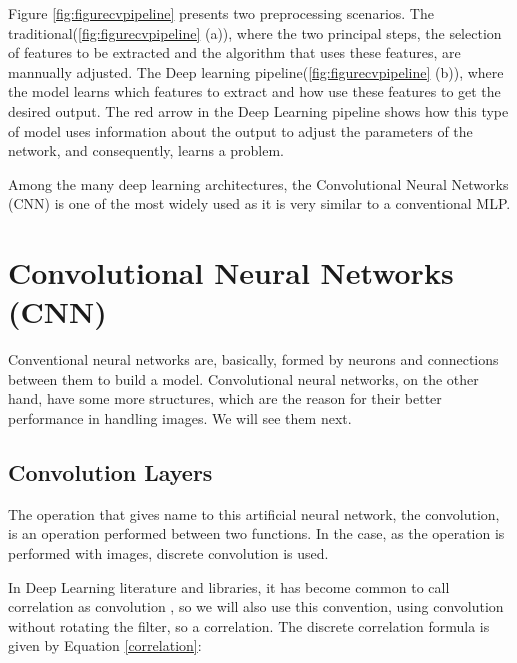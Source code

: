 Figure \ref{fig:figurecvpipeline} presents two preprocessing scenarios. The traditional(\ref{fig:figurecvpipeline} (a)), where the two principal steps, the selection of features to be extracted and the algorithm that uses these features, are mannually adjusted. The Deep learning pipeline(\ref{fig:figurecvpipeline} (b)), where the model learns which features to extract and how use these features to get the desired output. The red arrow in the Deep Learning pipeline shows how this type of model uses information about the output to adjust the parameters of the network, and consequently, learns a problem.

Among the many deep learning architectures, the Convolutional Neural Networks (CNN) is one of the most widely used as it is very similar to a conventional MLP.

\section{Convolutional Neural Networks (CNN)}

Conventional neural networks are, basically, formed by neurons and connections between them to build a model. Convolutional neural networks, on the other hand, have some more structures, which are the reason for their better performance in handling images. We will see them next.


\subsection{Convolution Layers}

The operation that gives name to this artificial neural network, the convolution, is an operation performed between two functions. In the case, as the operation is performed with images, discrete convolution is used.


In Deep Learning  literature and libraries, it has become common to call correlation as convolution \cite{goodfellow2016}, so we will also use this convention, using convolution without rotating the filter, so a correlation.
The discrete correlation formula is given by Equation \ref{correlation}:

